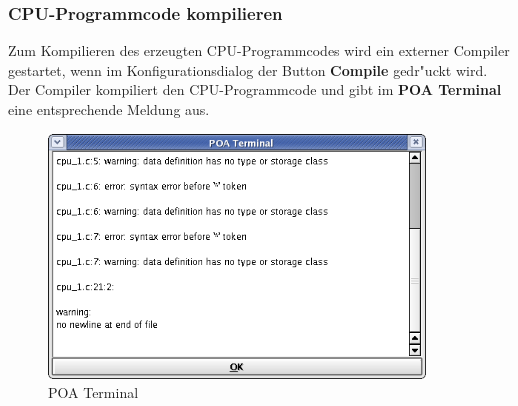 \documentclass[a4paper,titlepage,12pt,ngerman]{scrbook}
\begin{document}
\subsubsection{CPU-Programmcode kompilieren}
Zum Kompilieren des erzeugten CPU-Programmcodes wird ein externer Compiler gestartet, wenn im Konfigurationsdialog der Button {\bf Compile} gedr"uckt wird. Der Compiler kompiliert den CPU-Programmcode und gibt im {\bf POA Terminal} eine entsprechende Meldung aus.

\begin{figure}[htbp]

\begin{center}

\includegraphics[width=10cm]{Terminal}

\caption{POA Terminal}\label{test}

\end{center}

\end{figure}
\newpage



\end{document}
